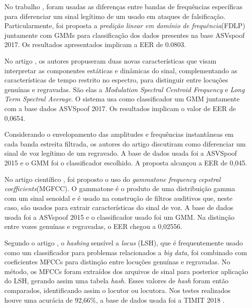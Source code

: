 		\par No trabalho \cite{ISI:000465363900139}, foram usadas as diferenças entre bandas de frequências específicas para diferenciar um sinal legítimo de um usado em ataques de falsificação. Particularmente, foi proposta a \textit{predição linear em domínio de frequência}(FDLP) juntamente com GMMs para classificação dos dados presentes na base ASVspoof  2017. Os resultados apresentados implicam a EER de 0.0803.
		
		\par No artigo \cite{Suthokumar2018}, os autores propuseram duas novas características que visam interpretar as componentes estáticas e dinâmicas do sinal, complementando as características de tempo restrito no espectro, para distinguir entre locuções genuínas e regravadas. São elas a \textit{Modulation  Spectral Centroid Frequency} e \textit{Long Term Spectral Average}. O sistema usa como classificador um GMM juntamente com a base dados ASVSpoof 2017. Os resultados implicam o valor de EER de 0,0654.
		
		\par Considerando o envelopamento das amplitudes e  frequências instantâneas em cada banda estreita filtrada, os autores do artigo \cite{ISI:000458728700054} discutiram como diferenciar um sinal de voz legítimo de um regravado. A base de dados usada foi a  ASVSpoof 2015 e o GMM foi o classificador escolhido. A proposta alcançou a EER de 0,045.

		\par No artigo científico \cite{ISI:000392503100008}, foi proposto o uso do \textit{gammatone frequency cepstral coefficients}(MGFCC). O gammatone é o produto de uma distribuição gamma com um sinal senoidal e é usado na construção de filtros auditivos que, neste caso, são usados para extrair características do sinal de voz. A base de dados usada foi a ASVspoof 2015 e o classificador usado foi um GMM. Na distinção entre vozes genuínas e regravadas, o EER chegou a 0,02556.
		
		\par Segundo o artigo \cite{8396208}, o \textit{hashing} sensível a \textit{locus} (LSH), que é frequentemente usado como um classificador para problemas relacionados a \textit{big data}, foi combinado com coeficientes MFCCs para distinção entre locuções genuínas e regravadas. No método, os MFCCs foram extraídos dos arquivos de sinal para posterior aplicação do LSH, gerando assim uma tabela \textit{hash}. Esses valores de \textit{hash} foram então comparados, identificando assim o locutor ou locutora. Nos testes realizados houve uma acurácia de 92,66\%, a base de dados usada foi a TIMIT 2018 \cite{TIMIT2018}. 

